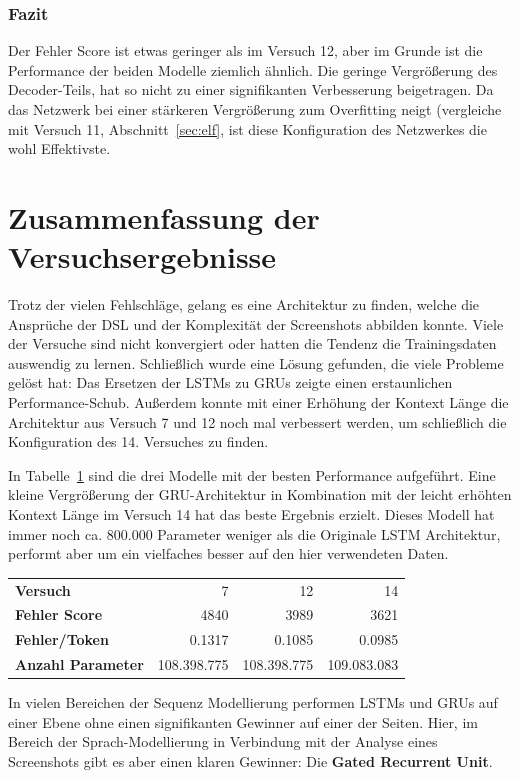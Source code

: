 \documentclass[pdftex,a4paper,halfparskip, article]{scrartcl}
\begin{document}
\subsubsection*{Fazit}

Der Fehler Score ist etwas geringer als im Versuch 12, aber im Grunde ist die Performance der beiden Modelle ziemlich ähnlich. Die geringe Vergrößerung des Decoder-Teils, hat so nicht zu einer signifikanten Verbesserung beigetragen. Da das Netzwerk bei einer stärkeren Vergrößerung zum Overfitting neigt (vergleiche mit Versuch 11, Abschnitt~\ref{sec:elf}, ist diese Konfiguration des Netzwerkes die wohl Effektivste.

\newpage
\section{Zusammenfassung der Versuchsergebnisse}\label{sec:zusammenfassung}

Trotz der vielen Fehlschläge, gelang es eine Architektur zu finden, welche die Ansprüche der DSL und der Komplexität der Screenshots abbilden konnte. Viele der Versuche sind nicht konvergiert oder hatten die Tendenz die Trainingsdaten auswendig zu lernen. Schließlich wurde eine Lösung gefunden, die viele Probleme gelöst hat:
Das Ersetzen der LSTMs zu GRUs zeigte einen erstaunlichen Performance-Schub. Außerdem konnte mit einer Erhöhung der Kontext Länge die Architektur aus Versuch 7 und 12 noch mal verbessert werden, um schließlich die Konfiguration des 14. Versuches zu finden. 

In Tabelle~\ref{tab:comparison} sind die drei Modelle mit der besten Performance aufgeführt. Eine kleine Vergrößerung der GRU-Architektur in Kombination mit der leicht erhöhten Kontext Länge im Versuch 14 hat das beste Ergebnis erzielt. Dieses Modell hat immer noch ca. 800.000 Parameter weniger als die Originale LSTM Architektur, performt aber um ein vielfaches besser auf den hier verwendeten Daten.

\begin{table}[]
\begin{tabular}{lrrr}
\textbf{Versuch}& 7      & 12       & 14    \\
\textbf{Fehler Score    }                     & 4840        & 3989        & 3621        \\
\textbf{Fehler/Token}                       & 0.1317      & 0.1085      & 0.0985      \\
\textbf{Anzahl Parameter} & 108.398.775 & 108.398.775 & 109.083.083
\end{tabular}

\label{tab:comparison}
\end{table}
In vielen Bereichen der Sequenz Modellierung performen LSTMs und GRUs auf einer Ebene ohne einen signifikanten Gewinner auf einer der Seiten. Hier, im Bereich der Sprach-Modellierung in Verbindung mit der Analyse eines Screenshots gibt es aber einen klaren Gewinner: Die \textbf{Gated Recurrent Unit}.
\end{document}

